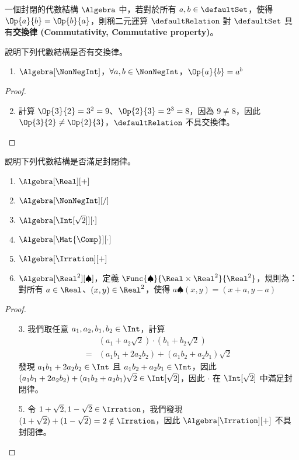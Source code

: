 \documentclass[12pt,a4paper,oneside]{report}
\begin{document}
\begin{CJK}{UTF8}{bkai}
\begin{mydef}[交換律]
\label{def:algebra:commutativity}
一個封閉的代數結構 $\Algebra$ 中，若對於所有 $a,b\in{\defaultSet}$，使得 $\Op{a}{b}=\Op{b}{a}$，則稱二元運算 $\defaultRelation$ 對 $\defaultSet$ 具有\textbf{交換律 (Commutativity, Commutative property)}。
\end{mydef}

\begin{myexample}
說明下列代數結構是否有交換律。
\begin{enumerate}
\item $\Algebra[\NonNegInt]$，$\forall{a,b}\in{\NonNegInt}$，$\Op{a}{b}=a^b$
\end{enumerate}
\end{myexample}
\begin{proof}
\begin{enumerate}
\item[]
\item 計算 $\Op{3}{2}=3^2=9$、$\Op{2}{3}=2^3=8$，因為 $9\neq{8}$，因此 $\Op{3}{2}\neq{\Op{2}{3}}$，$\defaultRelation$ 不具交換律。
\end{enumerate}
\end{proof}

\begin{myexample}
說明下列代數結構是否滿足封閉律。
\begin{enumerate}
\item $\Algebra[\Real][+]$
\item $\Algebra[\NonNegInt][/]$
\item $\Algebra[{\Int[\sqrt{2}]}][\cdot]$
\item $\Algebra[\Mat{\Comp}][\cdot]$
\item $\Algebra[\Irration][+]$
\item $\Algebra[\Real^2][\spadesuit]$，定義 $\Func{\spadesuit}{\Real\times{\Real^2}}{\Real^2}$，規則為：對所有 $a\in{\Real}$、${(x,y)}\in{\Real^2}$，使得 $a\spadesuit{(x,y)}=(x+a,y-a)$
\end{enumerate}
\end{myexample}
\begin{proof}
\begin{enumerate}
\item[]
\item[3.] 我們取任意 $a_1,a_2,b_1,b_2\in{\Int}$，計算
\begin{align*}
  & {({a_1+a_2\sqrt{2}})}\cdot{({b_1+b_2\sqrt{2}})}\\
= & (a_1b_1+2a_2b_2)+{(a_1b_2+a_2b_1)}\sqrt{2}
\end{align*}
發現 $a_1b_1+2a_2b_2\in{\Int}$ 且 $a_1b_2+a_2b_1\in{\Int}$，因此 $(a_1b_1+2a_2b_2)+{(a_1b_2+a_2b_1)}\sqrt{2}\in{\Int[\sqrt{2}]}$，因此 $\cdot$ 在 $\Int[\sqrt{2}]$ 中滿足封閉律。
\item[5.] 令 $1+\sqrt{2},1-\sqrt{2}\in{\Irration}$，我們發現 ${(1+\sqrt{2})}+{(1-\sqrt{2})}=2\notin{\Irration}$，因此 $\Algebra[\Irration][+]$ 不具封閉律。
\end{enumerate}
\end{proof}


\end{CJK}
\end{document}
